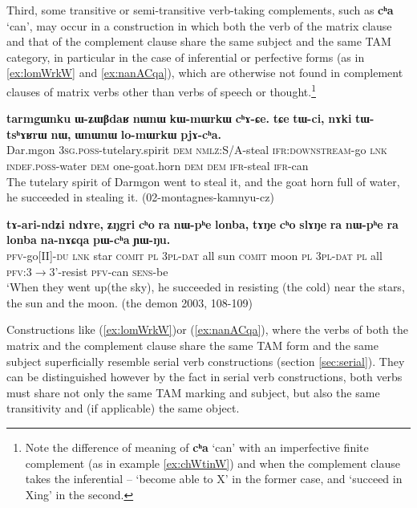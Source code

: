 \documentclass[oneside,a4paper,11pt]{article}
\newcommand{\ipa}[1]{\textbf{\phon#1}} %
\newcommand{\jpg}[2]{\ipa{#1} `#2'} %
\begin{document}
Third, some transitive or semi-transitive verb-taking complements, such as \jpg{cʰa}{can}, may occur in a construction in which both the verb of the matrix clause and that of the complement clause share the same subject and the same TAM category, in particular in the case of inferential or perfective forms (as in \ref{ex:lomWrkW} and \ref{ex:nanACqa}), which are otherwise not found in complement clauses of matrix verbs other than verbs of speech or thought.\footnote{Note the difference of meaning of \jpg{cʰa}{can} with an imperfective finite complement (as in example \ref{ex:chWtinW}) and when the complement clause takes the inferential -- `become able to X' in the former case, and `succeed in Xing' in the second.}
\begin{exe}
\ex \label{ex:lomWrkW}
\gll 
\ipa{tarmgɯnku} 	\ipa{ɯ-ʑɯβdaʁ} 	\ipa{nɯnɯ} 	\ipa{kɯ-mɯrkɯ} 	\ipa{cʰɤ-ɕe.} 	\ipa{tɕe} 	\ipa{tɯ-ci,} 	\ipa{nɤki} 	\ipa{tɯ-tsʰɤʁrɯ} 	\ipa{nɯ,} 	\ipa{ɯnɯnɯ} 	\ipa{lo-mɯrkɯ} 	\ipa{pjɤ-cʰa.} \\
Dar.mgon \textsc{3sg.poss}-tutelary.spirit \textsc{dem} \textsc{nmlz}:S/A-steal \textsc{ifr:downstream}-go \textsc{lnk} \textsc{indef.poss}-water \textsc{dem} one-goat.horn \textsc{dem} \textsc{dem} \textsc{ifr}-steal \textsc{ifr}-can \\
\glt The tutelary spirit of Darmgon went to steal it, and the goat horn full of water, he succeeded in stealing it. (02-montagnes-kamnyu-cz)
\end{exe}


\begin{exe}
\ex \label{ex:nanACqa}
\gll \ipa{tɤ-ari-ndʑi} 	\ipa{ndɤre,} 	\ipa{ʑŋgri} 	\ipa{cʰo} 	\ipa{ra} 	\ipa{nɯ-pʰe} 	\ipa{lonba,} 	\ipa{tɤŋe} 	\ipa{cʰo} 	\ipa{slɤŋe} 	\ipa{ra} 	\ipa{nɯ-pʰe} 	\ipa{ra} 	\ipa{lonba} 	\ipa{na-nɤɕqa} 	\ipa{pɯ-cʰa} 	\ipa{ɲɯ-ŋu.} \\ 
\textsc{pfv}-go[II]-\textsc{du} \textsc{lnk} star \textsc{comit} \textsc{pl} \textsc{3pl-dat} all sun \textsc{comit} moon \textsc{pl} \textsc{3pl-dat} \textsc{pl} all \textsc{pfv}:3$\rightarrow$3'-resist \textsc{pfv}-can \textsc{sens}-be \\
\glt `When they went up(the sky), he succeeded in resisting (the cold) near the stars, the sun and the moon. (the demon 2003, 108-109)
\end{exe}

Constructions like (\ref{ex:lomWrkW})or (\ref{ex:nanACqa}), where the verbs of both the matrix and the complement clause share the same TAM form and the same subject superficially resemble serial verb constructions (section \ref{sec:serial}). They can be distinguished however by the fact in serial verb constructions, both verbs must share not only the same TAM marking and subject, but also the same transitivity and (if applicable) the same object.
\end{document}
